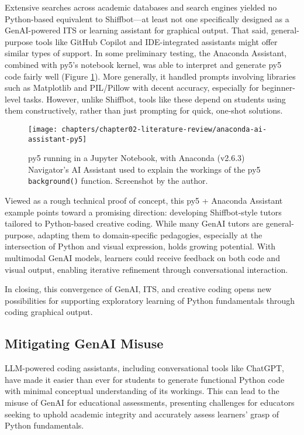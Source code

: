 Extensive searches across academic databases and search engines yielded no Python-based equivalent to Shiffbot---at least not one specifically designed as a GenAI-powered ITS or learning assistant for graphical output. That said, general-purpose tools like GitHub Copilot and IDE-integrated assistants might offer similar types of support. In some preliminary testing, the Anaconda Assistant, combined with py5's notebook kernel, was able to interpret and generate py5 code fairly well (Figure \ref{fig:anaconda-ai-assistant-py5}). More generally, it handled prompts involving libraries such as Matplotlib and PIL/Pillow with decent accuracy, especially for beginner-level tasks. However, unlike Shiffbot, tools like these depend on students using them constructively, rather than just prompting for quick, one-shot solutions.

\begin{figure}[htbp]
\centering
\texttt{[image: chapters/chapter02-literature-review/anaconda-ai-assistant-py5]}
\caption{py5 running in a Jupyter Notebook, with Anaconda (v2.6.3) Navigator's AI Assistant used to explain the workings of the py5 \texttt{background()} function. Screenshot by the author.}
\label{fig:anaconda-ai-assistant-py5}
\end{figure}

Viewed as a rough technical proof of concept, this py5 + Anaconda Assistant example points toward a promising direction: developing Shiffbot-style tutors tailored to Python-based creative coding. While many GenAI tutors are general-purpose, adapting them to domain-specific pedagogies, especially at the intersection of Python and visual expression, holds growing potential. With multimodal GenAI models, learners could receive feedback on both code and visual output, enabling iterative refinement through conversational interaction. 

In closing, this convergence of GenAI, ITS, and creative coding opens new possibilities for supporting exploratory learning of Python fundamentals through coding graphical output.

\subsection{Mitigating GenAI Misuse}

LLM-powered coding assistants, including conversational tools like ChatGPT, have made it easier than ever for students to generate functional Python code with minimal conceptual understanding of its workings. This can lead to the misuse of GenAI for educational assessments, presenting challenges for educators seeking to uphold academic integrity and accurately assess learners' grasp of Python fundamentals.

